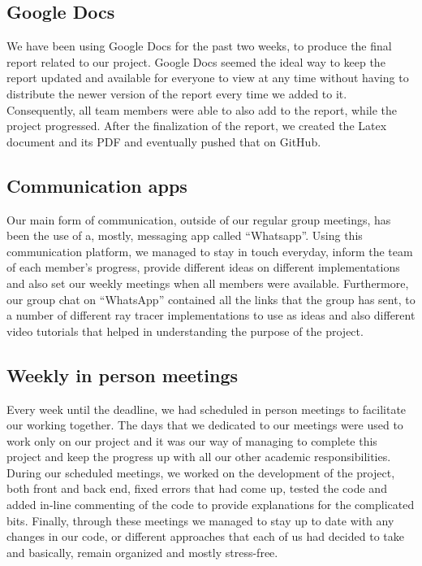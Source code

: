 \documentclass[11pt,a4paper]{article}
\begin{document}
\subsection{Google Docs}
We have been using Google Docs for the past two weeks, to produce the final report related to our project. Google Docs seemed the ideal way to keep the report updated and available for everyone to view at any time without having to distribute the newer version of the report every time we added to it. Consequently, all team members were able to also add to the report, while the project progressed. After the finalization of the report, we created the Latex document and its PDF and eventually pushed that on GitHub. 

\subsection{Communication apps}
Our main form of communication, outside of our regular group meetings, has been the use of a, mostly, messaging app called “Whatsapp”. Using this communication platform, we managed to stay in touch everyday, inform the team of each member’s progress, provide different ideas on different implementations and also set our weekly meetings when all members were available. Furthermore, our group chat on “WhatsApp” contained all the links that the group has sent, to a number of different ray tracer implementations to use as ideas and also different video tutorials that helped in understanding the purpose of the project. 


\subsection{Weekly in person meetings}
Every week until the deadline, we had scheduled in person meetings to facilitate our working together. The days that we dedicated to our meetings were used to work only on our project and it was our way of managing to complete this project and keep the progress up with all our other academic responsibilities. During our scheduled meetings, we worked on the development of the project, both front and back end, fixed errors that had come up, tested the code and added in-line commenting of the code to provide explanations for the complicated bits. Finally, through these meetings we managed to stay up to date with any changes in our code, or different approaches that each of us had decided to take and basically, remain organized and mostly stress-free.
\end{document}
